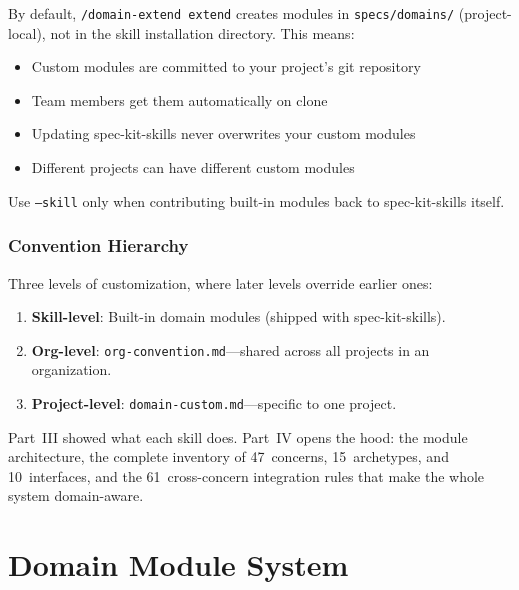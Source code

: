 \documentclass[11pt,a4paper,openright,twoside]{report}
\newcommand{\cmd}[1]{\texttt{/#1}}
\newcommand{\file}[1]{\texttt{#1}}
\begin{document}
\begin{warnbox}
By default, \cmd{domain-extend extend} creates modules in \file{specs/domains/} (project-local), not in the skill installation directory. This means:
\begin{itemize}[nosep]
\item Custom modules are committed to your project's git repository
\item Team members get them automatically on clone
\item Updating spec-kit-skills never overwrites your custom modules
\item Different projects can have different custom modules
\end{itemize}
Use \texttt{--skill} only when contributing built-in modules back to spec-kit-skills itself.
\end{warnbox}

\section{Convention Hierarchy}

Three levels of customization, where later levels override earlier ones:

\begin{enumerate}
  \item \textbf{Skill-level}: Built-in domain modules (shipped with spec-kit-skills).
  \item \textbf{Org-level}: \file{org-convention.md}---shared across all projects in an organization.
  \item \textbf{Project-level}: \file{domain-custom.md}---specific to one project.
\end{enumerate}

Part~III showed what each skill does. Part~IV opens the hood: the module architecture, the complete inventory of 47~concerns, 15~archetypes, and 10~interfaces, and the 61~cross-concern integration rules that make the whole system domain-aware.

\part{Domain Module System}

\end{document}
